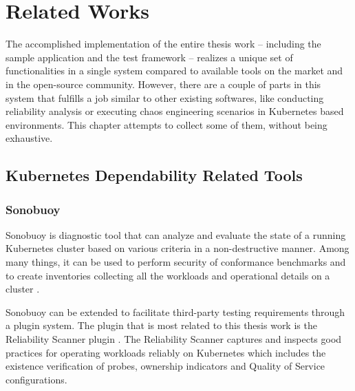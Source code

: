 \chapter{Related Works} \label{related-works}

The accomplished implementation of the entire thesis work -- including the sample application and the test framework -- realizes a unique set of functionalities in a single system compared to available tools on the market and in the open-source community. However, there are a couple of parts in this system that fulfills a job similar to other existing softwares, like conducting reliability analysis or executing chaos engineering scenarios in Kubernetes based environments. This chapter attempts to collect some of them, without being exhaustive.

\section{Kubernetes Dependability Related Tools}

\subsection{Sonobuoy}

Sonobuoy is diagnostic tool that can analyze and evaluate the state of a running Kubernetes cluster based on various criteria in a non-destructive manner. Among many things, it can be used to perform security of conformance benchmarks and to create inventories collecting all the workloads and operational details on a cluster \cite{Sonobuoy}.

Sonobuoy can be extended to facilitate third-party testing requirements through a plugin system. The plugin that is most related to this thesis work is the Reliability Scanner plugin \cite{SonobuoyReliabilityScanner}. The Reliability Scanner captures and inspects good practices for operating workloads reliably on Kubernetes which includes the existence verification of  probes, ownership indicators and Quality of Service configurations.

